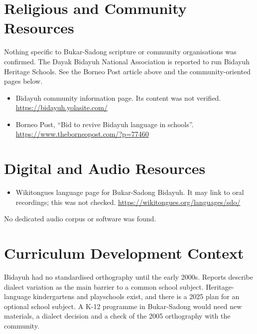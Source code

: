 \documentclass[12pt]{article}
\begin{document}
\section{Religious and Community Resources}
Nothing specific to Bukar-Sadong scripture or community organisations was confirmed. The Dayak Bidayuh National Association is reported to run Bidayuh Heritage Schools. See the Borneo Post article above and the community-oriented pages below.
\begin{itemize}
\item Bidayuh community information page. Its content was not verified. \url{https://bidayuh.yolasite.com/}
\item Borneo Post, ``Bid to revive Bidayuh language in schools''. \url{https://www.theborneopost.com/?p=77460}
\end{itemize}

\section{Digital and Audio Resources}
\begin{itemize}
\item Wikitongues language page for Bukar-Sadong Bidayuh. It may link to oral recordings; this was not checked. \url{https://wikitongues.org/languages/sdo/}
\end{itemize}
No dedicated audio corpus or software was found.

\section{Curriculum Development Context}
Bidayuh had no standardised orthography until the early 2000s. Reports describe dialect variation as the main barrier to a common school subject. Heritage-language kindergartens and playschools exist, and there is a 2025 plan for an optional school subject. A K-12 programme in Bukar-Sadong would need new materials, a dialect decision and a check of the 2005 orthography with the community.
\end{document}

